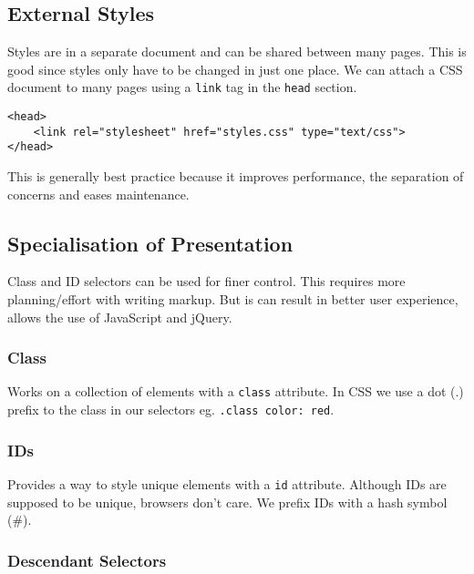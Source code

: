 \subsection{External Styles}\label{sub:external_styles}

Styles are in a separate document and can be shared between many pages.
This is good since styles only have to be changed in just one place.
We can attach a CSS document to many pages using a \texttt{link} tag in the \texttt{head} section.
\begin{verbatim}
<head>
    <link rel="stylesheet" href="styles.css" type="text/css">
</head>
\end{verbatim}
This is generally best practice because it improves performance, the separation of concerns and eases maintenance.

\subsection{Specialisation of Presentation}\label{sub:specialisation_of_presentation}

Class and ID selectors can be used for finer control.
This requires more planning/effort with writing markup.
But is can result in better user experience, allows the use of JavaScript and jQuery.

\subsubsection{Class}\label{ssub:class}

Works on a collection of elements with a \texttt{class} attribute.
In CSS we use a dot (.) prefix to the class in our selectors eg. \texttt{.class {color: red}}.

\subsubsection{IDs}\label{ssub:ids}

Provides a way to style unique elements with a \texttt{id} attribute.
Although IDs are supposed to be unique, browsers don't care.
We prefix IDs with a hash symbol (\#).

\subsubsection{Descendant Selectors}\label{ssub:descendant_selectors}

